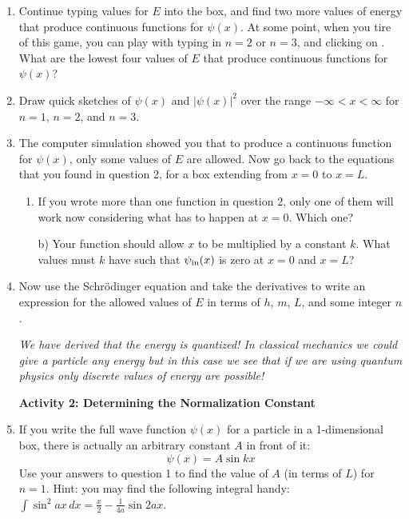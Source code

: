 \begin{enumerate}
\item Continue typing values for $E$ into the box, and find two more values of energy that produce continuous functions for $\psi(x)$.  At some point, when you tire of this game, you can play with typing in $n=2$ or $n=3$, and clicking on . What are the lowest four values of $E$ that produce continuous functions for $\psi(x)$?
\answerspace{0.3in}

\item Draw quick sketches of $\psi(x)$ and $|\psi(x)|^2$ over the range $-\infty<x<\infty$ for $n=1$, $n=2$, and $n=3$.
\answerspace{2.8in}

\item The computer simulation showed you that to produce a continuous function for $\psi(x)$, only some values of $E$ are allowed. Now go back to the equations that you found in question 2, for a box extending from $x=0$ to $x=L$.  
\begin{enumerate}
\item If you wrote more than one function in question 2, only one of them will work now considering what has to happen at $x=0$.  Which one?
\answerspace{0.3in}

b) Your function should allow $x$ to be multiplied by a constant $k$.  What values must $k$ have such that $\psi_{\rm in}(x)$ is zero at $x=0$ and $x=L$?  
\answerspace{0.3in}
\end{enumerate}

\item Now use the Schr\"odinger equation and take the derivatives to write an expression for the allowed values of $E$ in terms of $h$, $m$, $L$, and some integer $n$.  
\answerspace{1.5in}

\textit{We have derived that the energy is quantized!  In classical mechanics we could give a particle any energy but in this case we see that if we are using quantum physics only discrete values of energy are possible!}

\pagebreak[3]

\textbf{Activity 2: Determining the Normalization Constant}

\item If you write the full wave function $\psi(x)$ for a particle in a 1-dimensional box, there is actually an arbitrary constant $A$ in front of it:
$$\psi(x)=A\sin kx$$
Use your answers to question 1 to find the value of $A$ (in terms of $L$) for $n=1$.  
Hint: you may find the following integral handy: $\int \sin^2ax \, dx = \frac{x}{2} -\frac{1}{4a}\sin 2ax $.
\answerspace{1.7in}


\end{enumerate}
